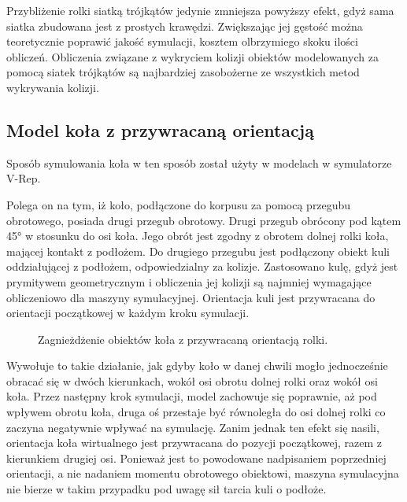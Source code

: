 		Przybliżenie rolki siatką trójkątów jedynie zmniejsza powyższy efekt, gdyż sama siatka zbudowana jest z prostych krawędzi.
		Zwiększając jej gęstość można teoretycznie poprawić jakość symulacji, kosztem olbrzymiego skoku ilości obliczeń.
		Obliczenia związane z wykryciem kolizji obiektów modelowanych za pomocą siatek trójkątów są najbardziej zasobożerne ze wszystkich metod wykrywania kolizji. 

	\subsection{Model koła z przywracaną orientacją}
		Sposób symulowania koła w ten sposób został użyty w modelach w symulatorze V-Rep.

		Polega on na tym, iż koło, podłączone do korpusu za pomocą przegubu obrotowego, posiada drugi przegub obrotowy.
		Drugi przegub obrócony pod kątem 45° w stosunku do osi koła.
		Jego obrót jest zgodny z obrotem dolnej rolki koła, mającej kontakt z podłożem.
		Do drugiego przegubu jest podłączony obiekt kuli oddziałującej z podłożem, odpowiedzialny za kolizje.
		Zastosowano kulę, gdyż jest prymitywem geometrycznym i obliczenia jej kolizji są najmniej wymagające obliczeniowo dla maszyny symulacyjnej.
		Orientacja kuli jest przywracana do orientacji początkowej w każdym kroku symulacji.

		\begin{figure}[H]
		\caption{Zagnieżdżenie obiektów koła z przywracaną orientacją rolki.}
		\label{fig:vrep_wheel}
		\end{figure}

		Wywołuje to takie działanie, jak gdyby koło w danej chwili mogło jednocześnie obracać się w dwóch kierunkach, wokół osi obrotu dolnej rolki oraz wokół osi koła.
		Przez następny krok symulacji, model zachowuje się poprawnie, aż pod wpływem obrotu koła, druga oś przestaje być równoległa do osi dolnej rolki
		co zaczyna negatywnie wpływać na symulację.
		Zanim jednak ten efekt się nasili, orientacja koła wirtualnego jest przywracana do pozycji początkowej, razem z kierunkiem drugiej osi.
		Ponieważ jest to powodowane nadpisaniem poprzedniej orientacji, a nie nadaniem momentu obrotowego obiektowi, 
		maszyna symulacyjna nie bierze w takim przypadku pod uwagę sił tarcia kuli o podłoże. 

